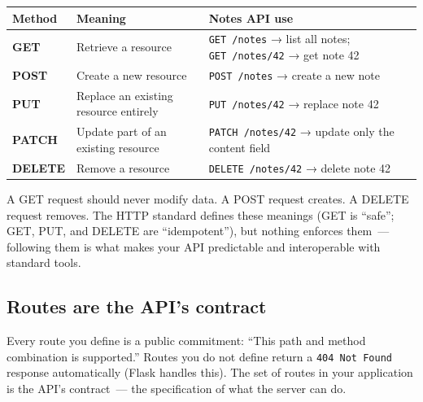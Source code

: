 {\def\LTcaptype{none} %
\begin{longtable}[]{@{}
  >{\raggedright\arraybackslash}p{}
  >{\raggedright\arraybackslash}p{}
  >{\raggedright\arraybackslash}p{}@{}}
\toprule\noalign{}
\begin{minipage}[b]{\linewidth}\raggedright
Method
\end{minipage} & \begin{minipage}[b]{\linewidth}\raggedright
Meaning
\end{minipage} & \begin{minipage}[b]{\linewidth}\raggedright
Notes API use
\end{minipage} \\
\midrule\noalign{}
\endhead
\bottomrule\noalign{}
\endlastfoot
\textbf{GET} & Retrieve a resource & \texttt{GET\ /notes} → list all notes; \texttt{GET\ /notes/42} → get note 42 \\
\textbf{POST} & Create a new resource & \texttt{POST\ /notes} → create a new note \\
\textbf{PUT} & Replace an existing resource entirely & \texttt{PUT\ /notes/42} → replace note 42 \\
\textbf{PATCH} & Update part of an existing resource & \texttt{PATCH\ /notes/42} → update only the content field \\
\textbf{DELETE} & Remove a resource & \texttt{DELETE\ /notes/42} → delete note 42 \\
\end{longtable}
}

A GET request should never modify data. A POST request creates. A DELETE request removes. The HTTP standard defines these meanings (GET is ``safe''; GET, PUT, and DELETE are ``idempotent''), but nothing enforces them~--- following them is what makes your API predictable and interoperable with standard tools.

\subsection*{Routes are the API's contract}\label{04-request-handling-paths:routes-are-the-apis-contract}

Every route you define is a public commitment: ``This path and method combination is supported.'' Routes you do not define return a \texttt{404\ Not\ Found} response automatically (Flask handles this). The set of routes in your application is the API's contract~--- the specification of what the server can do.

